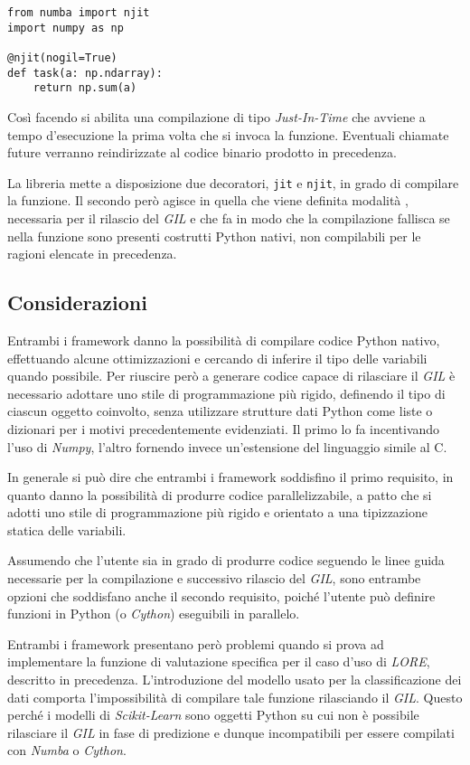 \begin{lstlisting}[caption={Esempio di utilizzo Numba}]
from numba import njit
import numpy as np

@njit(nogil=True)
def task(a: np.ndarray):
	return np.sum(a)
\end{lstlisting}

Così facendo si abilita una compilazione di tipo \textit{Just-In-Time} che
avviene a tempo d'esecuzione la prima volta che si invoca la funzione. Eventuali
chiamate future verranno reindirizzate al codice binario prodotto in precedenza.

La libreria mette a disposizione due decoratori, \verb|jit| e \verb|njit|, in
grado di compilare la funzione. Il secondo però agisce in quella che viene
definita modalità , necessaria per il rilascio del \textit{GIL}
e che fa in modo che la compilazione fallisca se nella funzione sono presenti
costrutti Python nativi, non compilabili per le ragioni elencate in precedenza.


\subsection*{Considerazioni}

Entrambi i framework danno la possibilità di compilare codice Python nativo,
effettuando alcune ottimizzazioni e cercando di inferire il tipo delle
variabili quando possibile. Per riuscire però a generare codice capace di
rilasciare il \textit{GIL} è necessario adottare uno stile di programmazione
più rigido, definendo il tipo di ciascun oggetto coinvolto, senza utilizzare
strutture dati Python come liste o dizionari per i motivi precedentemente
evidenziati. Il primo lo fa incentivando l'uso di \textit{Numpy}, l'altro
fornendo invece un'estensione del linguaggio simile al C.

In generale si può dire che entrambi i framework soddisfino il primo requisito,
in quanto danno la possibilità di produrre codice parallelizzabile, a patto che
si adotti uno stile di programmazione più rigido e orientato a una tipizzazione
statica delle variabili.

Assumendo che l'utente sia in grado di produrre codice seguendo le linee guida
necessarie per la compilazione e successivo rilascio del \textit{GIL}, sono
entrambe opzioni che soddisfano anche il secondo requisito, poiché l'utente può
definire funzioni in Python (o \textit{Cython}) eseguibili in parallelo.

Entrambi i framework presentano però problemi quando si prova ad implementare
la funzione di valutazione specifica per il caso d'uso di \textit{LORE},
descritto in precedenza. L'introduzione del modello usato per la classificazione
dei dati comporta l'impossibilità di compilare tale funzione rilasciando il
\textit{GIL}. Questo perché i modelli di \textit{Scikit-Learn} sono oggetti
Python su cui non è possibile rilasciare il \textit{GIL} in fase di predizione e
dunque incompatibili per essere compilati con \textit{Numba} o \textit{Cython}.

